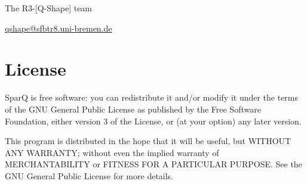 \documentclass[headsepline]{scrreprt}
\theoremstyle{definition}
\newcommand{\qshape}{R3-[Q-Shape]}
\newcommand{\engine}{SparQ}
\begin{document}
\vspace{0.5cm}
\noindent
The \qshape{} team

\noindent
\url{qshape@sfbtr8.uni-bremen.de}




\section*{License}

SparQ is free software: you can redistribute it and/or modify
it under the terms of the GNU General Public License as published by
the Free Software Foundation, either version 3 of the License, or
(at your option) any later version.

 This program is distributed in the hope that it will be useful,
 but WITHOUT ANY WARRANTY; without even the implied warranty of
 MERCHANTABILITY or FITNESS FOR A PARTICULAR PURPOSE.  See the
 GNU General Public License for more details.
\end{document}
